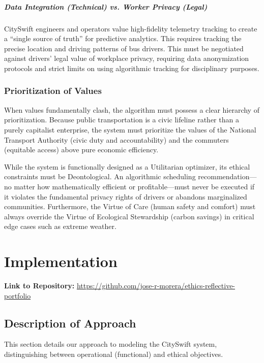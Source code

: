\documentclass[]
{UCD_CS_41820_Report}
\begin{document}
\paragraph{Data Integration (Technical) vs. Worker Privacy (Legal)}
CitySwift engineers and operators value high-fidelity telemetry tracking to create a ``single source of truth'' for predictive analytics. This requires tracking the precise location and driving patterns of bus drivers. This must be negotiated against drivers' legal value of workplace privacy, requiring data anonymization protocols and strict limits on using algorithmic tracking for disciplinary purposes.

\subsection*{Prioritization of Values}

When values fundamentally clash, the algorithm must possess a clear hierarchy of prioritization. Because public transportation is a civic lifeline rather than a purely capitalist enterprise, the system must prioritize the values of the National Transport Authority (civic duty and accountability) and the commuters (equitable access) above pure economic efficiency.

While the system is functionally designed as a Utilitarian optimizer, its ethical constraints must be Deontological. An algorithmic scheduling recommendation—no matter how mathematically efficient or profitable—must never be executed if it violates the fundamental privacy rights of drivers or abandons marginalized communities. Furthermore, the Virtue of Care (human safety and comfort) must always override the Virtue of Ecological Stewardship (carbon savings) in critical edge cases such as extreme weather.



\chapter{Implementation}
\textbf{Link to Repository:} \href{https://github.com/jose-r-morera/ethics-reflective-portfolio}{https://github.com/jose-r-morera/ethics-reflective-portfolio}

\section{Description of Approach}
This section details our approach to modeling the CitySwift system, distinguishing between operational (functional) and ethical objectives.
\end{document}
